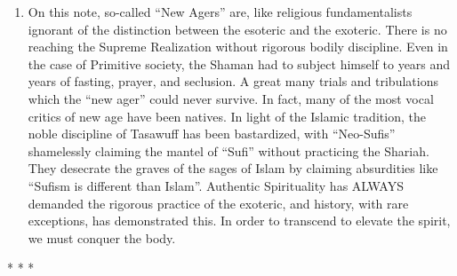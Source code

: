 \begin{enumerate}
\item On this note, so-called ``New Agers'' are, like religious fundamentalists ignorant of the distinction between the esoteric and the exoteric. There is no reaching the Supreme Realization without rigorous bodily discipline. Even in the case of Primitive society, the Shaman had to subject himself to years and years of fasting, prayer, and seclusion. A great many trials and tribulations which the ``new ager'' could never survive. In fact, many of the most vocal critics of new age have been natives. In light of the Islamic tradition, the noble discipline of Tasawuff has been bastardized, with ``Neo-Sufis'' shamelessly claiming the mantel of ``Sufi'' without practicing the Shariah. They desecrate the graves of the sages of Islam by claiming absurdities like ``Sufism is different than Islam''. Authentic Spirituality has ALWAYS demanded the rigorous practice of the exoteric, and history, with rare exceptions, has demonstrated this. In order to transcend to elevate the spirit, we must conquer the body.
\end{enumerate}




\begin{center}* * *\end{center}

